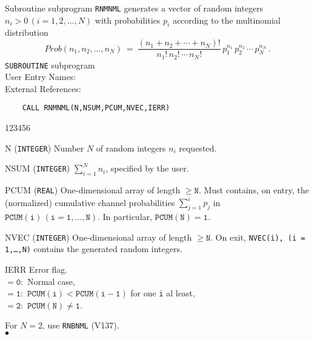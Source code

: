                        
            
\Submitter{}                        
Subroutine subprogram {\tt RNMNML} generates a vector of random integers
$n_i>0 \, (i=1,2,\ldots,N)$ with probabilities $p_i$
according to the multinomial distribution
$$ Prob(n_1,n_2,\ldots,n_N) \ = \ \displaystyle
\frac{(n_1+n_2+\cdots+n_N)!}{n_1!\,n_2!\,\cdots\,n_N!}\,
p_1^{n_1}\,p_2^{n_2}\,\cdots\,p_N^{n_N}\,.$$
\Structure
{\tt SUBROUTINE} subprogram \\
User Entry Names: \\
External References: 
\Usage
\begin{verbatim}
    CALL RNMNML(N,NSUM,PCUM,NVEC,IERR)
\end{verbatim}
\begin{DLtt}{123456}
\item[N] ({\tt INTEGER}) Number $N$ of random integers $n_i$
requested.
\item[NSUM] ({\tt INTEGER}) $\sum_{i=1}^N n_i$, specified by the user.
\item[PCUM] ({\tt REAL}) One-dimensional array of length
$\mathtt{\ge N}$. Must contains, on entry, the (normalized)
cumulative channel probabilities $\sum_{j=1}^i p_j$
in $\mathtt{PCUM(i)\,(i=1,\ldots,N)}$. In particular,
$\mathtt{PCUM(N)=1}$.
\item[NVEC] ({\tt INTEGER}) One-dimensional array of length
$\mathtt{\ge N}$. On exit, {\tt NVEC(i),\,(i = 1,\ldots,N)}
contains the generated random integers.
\item[IERR] Error flag. \\
$\mathtt{= 0:}$ Normal case, \\
$\mathtt{= 1:}$ $\mathtt{PCUM(i) < PCUM(i-1)}$
for one {\tt i} al least, \\
$\mathtt{= 2:}$ $\mathtt{PCUM(N) \ne 1}$.
\end{DLtt}
\Notes
For $N=2$, use {\tt RNBNML} (V137).
\\ $\bullet$
